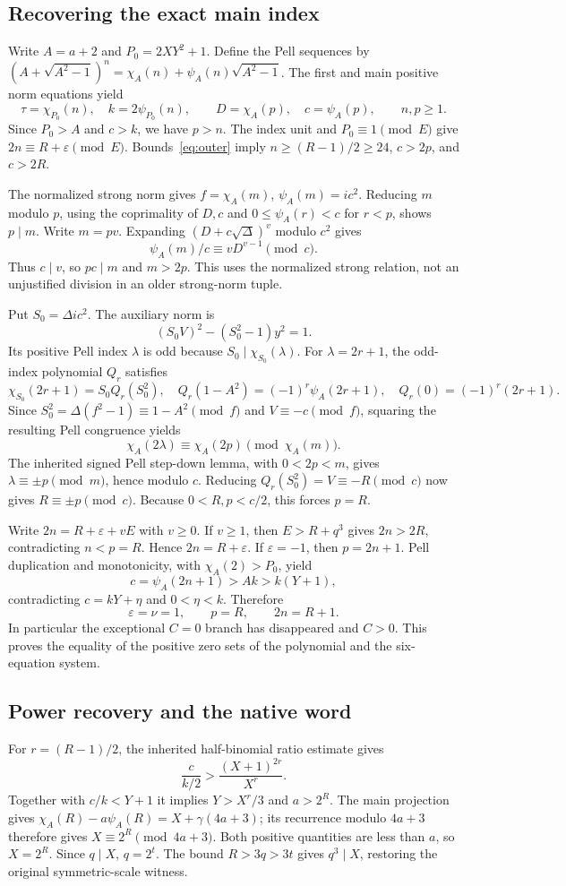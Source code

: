 \documentclass[11pt]{article}
\begin{document}
\subsection{Recovering the exact main index}
Write \(A=a+2\) and \(P_0=2XY^2+1\). Define the Pell sequences by
\((A+\sqrt{A^2-1})^n=\chi_A(n)+\psi_A(n)\sqrt{A^2-1}\).
The first and main positive norm equations yield
\[
 \tau=\chi_{P_0}(n),\quad k=2\psi_{P_0}(n),\qquad
 D=\chi_A(p),\quad c=\psi_A(p),\qquad n,p\ge1.
\]
Since \(P_0>A\) and \(c>k\), we have \(p>n\). The index unit and \(P_0\equiv1\pmod E\) give \(2n\equiv R+\varepsilon\pmod E\). Bounds~\eqref{eq:outer} imply \(n\ge(R-1)/2\ge24\), \(c>2p\), and \(c>2R\).

The normalized strong norm gives \(f=\chi_A(m)\), \(\psi_A(m)=ic^2\). Reducing \(m\) modulo \(p\), using the coprimality of \(D,c\) and \(0\le\psi_A(r)<c\) for \(r<p\), shows \(p\mid m\). Write \(m=pv\). Expanding \((D+c\sqrt\Delta)^v\) modulo \(c^2\) gives
\[
 \psi_A(m)/c\equiv vD^{v-1}\pmod c.
\]
Thus \(c\mid v\), so \(pc\mid m\) and \(m>2p\). This uses the normalized strong relation, not an unjustified division in an older strong-norm tuple.

Put \(S_0=\Delta ic^2\). The auxiliary norm is
\[
 (S_0V)^2-(S_0^2-1)y^2=1.
\]
Its positive Pell index \(\lambda\) is odd because \(S_0\mid\chi_{S_0}(\lambda)\). For \(\lambda=2r+1\), the odd-index polynomial \(Q_r\) satisfies
\[
 \chi_{S_0}(2r+1)=S_0Q_r(S_0^2),\quad
 Q_r(1-A^2)=(-1)^r\psi_A(2r+1),\quad Q_r(0)=(-1)^r(2r+1).
\]
Since \(S_0^2=\Delta(f^2-1)\equiv1-A^2\pmod f\) and \(V\equiv-c\pmod f\), squaring the resulting Pell congruence yields
\[\chi_A(2\lambda)\equiv\chi_A(2p)\pmod{\chi_A(m)}.\]
The inherited signed Pell step-down lemma, with \(0<2p<m\), gives
\(\lambda\equiv\pm p\pmod m\), hence modulo \(c\). Reducing
\(Q_r(S_0^2)=V\equiv-R\pmod c\) now gives \(R\equiv\pm p\pmod c\). Because \(0<R,p<c/2\), this forces \(p=R\).

Write \(2n=R+\varepsilon+vE\) with \(v\ge0\). If \(v\ge1\), then \(E>R+q^3\) gives \(2n>2R\), contradicting \(n<p=R\). Hence \(2n=R+\varepsilon\). If \(\varepsilon=-1\), then \(p=2n+1\). Pell duplication and monotonicity, with \(\chi_A(2)>P_0\), yield
\[
 c=\psi_A(2n+1)>Ak>k(Y+1),
\]
contradicting \(c=kY+\eta\) and \(0<\eta<k\). Therefore
\[
 \varepsilon=\nu=1,\qquad p=R,\qquad 2n=R+1.
\]
In particular the exceptional \(C=0\) branch has disappeared and \(C>0\). This proves the equality of the positive zero sets of the polynomial and the six-equation system.

\subsection{Power recovery and the native word}
For \(r=(R-1)/2\), the inherited half-binomial ratio estimate gives
\[
 \frac{c}{k/2}>\frac{(X+1)^{2r}}{X^r}.
\]
Together with \(c/k<Y+1\) it implies \(Y>X^r/3\) and \(a>2^R\). The main projection gives
\(\chi_A(R)-a\psi_A(R)=X+\gamma(4a+3)\); its recurrence modulo \(4a+3\) therefore gives \(X\equiv2^R\pmod{4a+3}\). Both positive quantities are less than \(a\), so \(X=2^R\). Since \(q\mid X\), \(q=2^t\). The bound \(R>3q>3t\) gives \(q^3\mid X\), restoring the original symmetric-scale witness.
\end{document}
